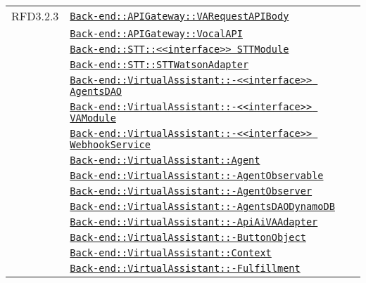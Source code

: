 \begin{longtable}{|>{\centering}m{3cm}|m{10cm}<{\centering}|}
RFD3.2.3 & \hyperref[Back-end::APIGateway::VARequestAPIBody]{\texttt{Back-end::APIGateway::VARequestAPIBody}}\\
& \hyperref[Back-end::APIGateway::VocalAPI]{\texttt{Back-end::APIGateway::VocalAPI}}\\
& \hyperref[Back-end::STT::<<interface>> STTModule]{\texttt{Back-end::STT::<<interface>> STTModule}}\\
& \hyperref[Back-end::STT::STTWatsonAdapter]{\texttt{Back-end::STT::STTWatsonAdapter}}\\
& \hyperref[Back-end::VirtualAssistant::<<interface>> AgentsDAO]{\texttt{Back-end::VirtualAssistant::-\linebreak <<interface>> AgentsDAO}}\\
& \hyperref[Back-end::VirtualAssistant::<<interface>> VAModule]{\texttt{Back-end::VirtualAssistant::-\linebreak <<interface>> VAModule}}\\
& \hyperref[Back-end::VirtualAssistant::<<interface>> WebhookService]{\texttt{Back-end::VirtualAssistant::-\linebreak <<interface>> WebhookService}}\\
& \hyperref[Back-end::VirtualAssistant::Agent]{\texttt{Back-end::VirtualAssistant::Agent}}\\
& \hyperref[Back-end::VirtualAssistant::AgentObservable]{\texttt{Back-end::VirtualAssistant::-\linebreak AgentObservable}}\\
& \hyperref[Back-end::VirtualAssistant::AgentObserver]{\texttt{Back-end::VirtualAssistant::-\linebreak AgentObserver}}\\
& \hyperref[Back-end::VirtualAssistant::AgentsDAODynamoDB]{\texttt{Back-end::VirtualAssistant::-\linebreak AgentsDAODynamoDB}}\\
& \hyperref[Back-end::VirtualAssistant::ApiAiVAAdapter]{\texttt{Back-end::VirtualAssistant::-\linebreak ApiAiVAAdapter}}\\
& \hyperref[Back-end::VirtualAssistant::ButtonObject]{\texttt{Back-end::VirtualAssistant::-\linebreak ButtonObject}}\\
& \hyperref[Back-end::VirtualAssistant::Context]{\texttt{Back-end::VirtualAssistant::Context}}\\
& \hyperref[Back-end::VirtualAssistant::Fulfillment]{\texttt{Back-end::VirtualAssistant::-\linebreak Fulfillment}}\\

\end{longtable}

